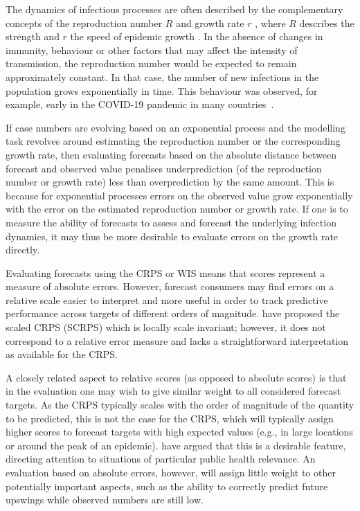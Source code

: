 \documentclass{article}
\begin{document}
The dynamics of infectious processes are often described by the complementary concepts of the reproduction number $R$ \citep{gosticPracticalConsiderationsMeasuring2020} and growth rate $r$ \citep{wallingaHowGenerationIntervals2007}, where $R$ describes the strength and $r$ the speed of epidemic growth \citep{dushoffSpeedStrengthEpidemic2021}.
In the absence of changes in immunity, behaviour or other factors that may affect the intensity of transmission, the reproduction number would be expected to remain approximately constant.
In that case, the number of new infections in the population grows exponentially in time.
This behaviour was observed, for example, early in the COVID-19 pandemic in many countries~\citep{pellisChallengesControlCOVID192021}.

If case numbers are evolving based on an exponential process and the  modelling task revolves around estimating the reproduction number or the corresponding growth rate, then evaluating forecasts based on the absolute distance between forecast and observed value penalises underprediction (of the reproduction number or growth rate) less than overprediction by the same amount. This is because for exponential processes errors on the observed value grow exponentially with the error on the estimated reproduction number or growth rate. 
If one is to measure the ability of forecasts to assess and forecast the underlying infection dynamics, it may thus be more desirable to evaluate errors on the growth rate directly.

Evaluating forecasts using the CRPS or WIS means that scores represent a measure of absolute errors. However, forecast consumers may find errors on a relative scale easier to interpret and more useful in order to track predictive performance across targets of different orders of magnitude. 
\cite{bolinLocalScaleInvariance2021} have proposed the scaled CRPS (SCRPS) which is locally scale invariant; however, it does not correspond to a relative error measure and lacks a straightforward interpretation as available for the CRPS. 

A closely related aspect to relative scores (as opposed to absolute scores) is that in the evaluation one may wish to give similar weight to all considered forecast targets. As the CRPS typically scales with the order of magnitude of the quantity to be predicted, this is not the case for the CRPS, which will typically assign higher scores to forecast targets with high expected values (e.g., in large locations or around the peak of an epidemic). \cite{bracherEvaluatingEpidemicForecasts2021} have argued that this is a desirable feature, directing attention to situations of particular public health relevance. An evaluation based on absolute errors, however, will assign little weight to other potentially important aspects, such as the ability to correctly predict future upswings while observed numbers are still low. 
\end{document}
